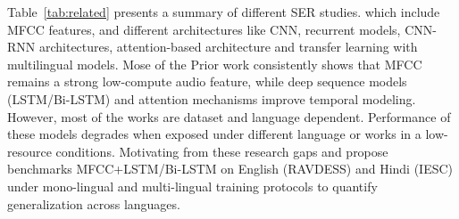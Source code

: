 \documentclass[runningheads]{llncs}
\begin{document}
Table~\ref{tab:related} presents a summary of different SER studies. which include MFCC features, and different architectures like CNN, recurrent models, CNN-RNN architectures, attention-based architecture and transfer learning with multilingual models. Mose of the Prior work consistently shows that MFCC remains a strong low-compute audio feature, while deep sequence models (LSTM/Bi-LSTM) and attention mechanisms improve temporal modeling. However, most of the works are dataset and language dependent. Performance of these models degrades when exposed under different language or works in a low-resource conditions. Motivating from these research gaps and propose benchmarks MFCC+LSTM/Bi-LSTM on English (RAVDESS) and Hindi (IESC) under mono-lingual and multi-lingual training protocols to quantify generalization across languages.
\end{document}
